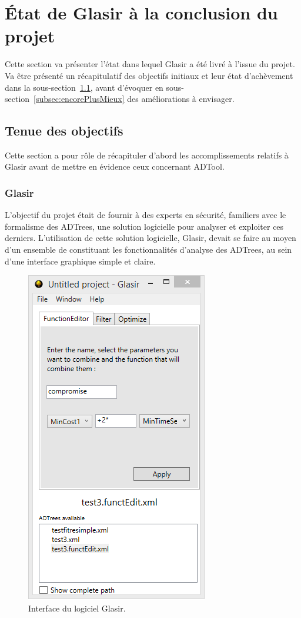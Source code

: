 \section{État de Glasir à la conclusion du projet}
\label{sec:etatFinal}

Cette section va présenter l'état dans lequel Glasir a été livré à l'issue du projet. Va être présenté un récapitulatif des objectifs initiaux et leur état d'achèvement dans la {\sc sous-section}~\ref{subsec:objOK}, avant d'évoquer en {\sc sous-section}~\ref{subsec:encorePlusMieux} des améliorations à envisager.

\subsection{Tenue des objectifs}
\label{subsec:objOK}

Cette section a pour rôle de récapituler d'abord les accomplissements relatifs à Glasir avant de mettre en évidence ceux concernant ADTool.

\subsubsection{Glasir}
\label{sssec:obj_glasir}

L'objectif du projet était de fournir à des experts en sécurité, familiers avec le formalisme des ADTrees, une solution logicielle pour analyser et exploiter ces derniers. L'utilisation de cette solution logicielle, Glasir, devait se faire au moyen d'un ensemble de \fg constituant les fonctionnalités d'analyse des ADTrees, au sein d'une interface graphique simple et claire.

    \begin{figure}[!h]
        \centering
        \includegraphics[height=0.36\textwidth]{figure/interface.png}
        \caption{Interface du logiciel Glasir.}
        \label{fig:InterfaceGlasir}
    \end{figure}

